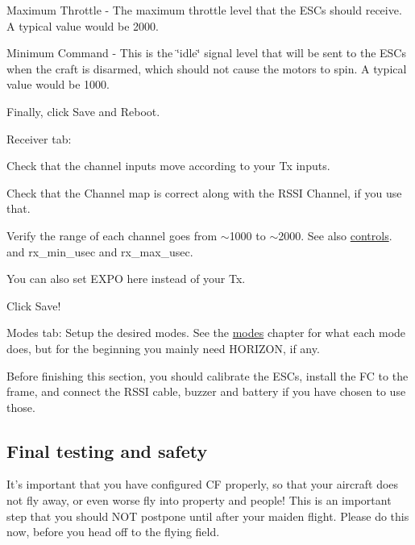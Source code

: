 \begin{DoxyItemize}
\begin{DoxyItemize}
\begin{DoxyItemize}
\item Maximum Throttle -\/ The maximum throttle level that the E\+S\+Cs should receive. A typical value would be 2000.
\item Minimum Command -\/ This is the \char`\"{}idle\char`\"{} signal level that will be sent to the E\+S\+Cs when the craft is disarmed, which should not cause the motors to spin. A typical value would be 1000.
\end{DoxyItemize}
\item Finally, click Save and Reboot.
\end{DoxyItemize}
\item Receiver tab\+:
\begin{DoxyItemize}
\item Check that the channel inputs move according to your Tx inputs.
\item Check that the Channel map is correct along with the R\+S\+S\+I Channel, if you use that.
\item Verify the range of each channel goes from $\sim$1000 to $\sim$2000. See also \hyperlink{Controls_8md}{controls}. and {\ttfamily rx\+\_\+min\+\_\+usec} and {\ttfamily rx\+\_\+max\+\_\+usec}.
\item You can also set E\+X\+P\+O here instead of your Tx.
\item Click Save!
\end{DoxyItemize}
\item Modes tab\+: Setup the desired modes. See the \hyperlink{Modes_8md}{modes} chapter for what each mode does, but for the beginning you mainly need H\+O\+R\+I\+Z\+O\+N, if any.
\item Before finishing this section, you should calibrate the E\+S\+Cs, install the F\+C to the frame, and connect the R\+S\+S\+I cable, buzzer and battery if you have chosen to use those.
\end{DoxyItemize}

\subsection*{Final testing and safety}

It's important that you have configured C\+F properly, so that your aircraft does not fly away, or even worse fly into property and people! This is an important step that you should N\+O\+T postpone until after your maiden flight. Please do this now, before you head off to the flying field.


